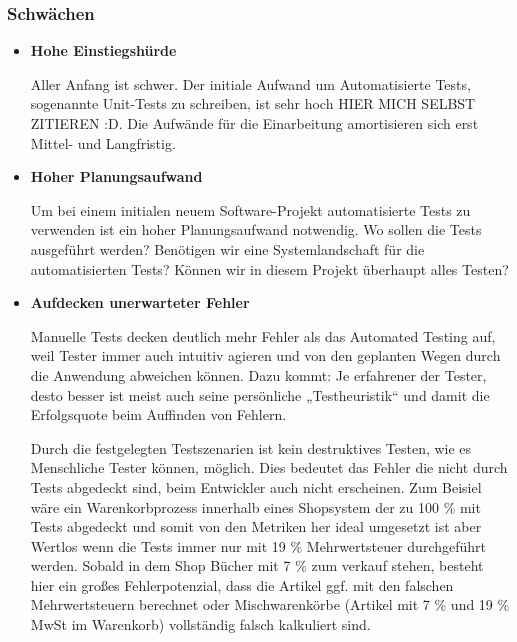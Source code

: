 \subsubsection{Schwächen}
\begin{itemize}	
	\item \textbf{Hohe Einstiegshürde}
	
	Aller Anfang ist schwer. Der initiale Aufwand um Automatisierte Tests, sogenannte Unit-Tests zu schreiben, ist sehr hoch HIER MICH SELBST ZITIEREN :D. Die Aufwände für die Einarbeitung amortisieren sich erst Mittel- und Langfristig.
	
	\item \textbf{Hoher Planungsaufwand}
	
	Um bei einem initialen neuem Software-Projekt automatisierte Tests zu verwenden ist ein hoher Planungsaufwand notwendig. Wo sollen die Tests ausgeführt werden? Benötigen wir eine Systemlandschaft für die automatisierten Tests? Können wir in diesem Projekt überhaupt alles Testen?
	
	\item \textbf{Aufdecken unerwarteter Fehler}
	
	Manuelle Tests decken deutlich mehr Fehler als das Automated Testing auf, weil Tester immer auch intuitiv agieren und von den geplanten Wegen durch die Anwendung abweichen können. Dazu kommt: Je erfahrener der Tester, desto besser ist meist auch seine persönliche „Testheuristik“ und damit die Erfolgsquote beim Auffinden von Fehlern.
	
	Durch die festgelegten Testszenarien ist kein destruktives Testen, wie es Menschliche Tester können, möglich. Dies bedeutet das Fehler die nicht durch Tests abgedeckt sind, beim Entwickler auch nicht erscheinen. Zum Beisiel wäre ein Warenkorbprozess innerhalb eines Shopsystem der zu 100 \% mit Tests abgedeckt und somit von den Metriken her ideal umgesetzt ist aber Wertlos wenn die Tests immer nur mit 19 \% Mehrwertsteuer durchgeführt werden. Sobald in dem Shop Bücher mit 7 \% zum verkauf stehen, besteht hier ein großes Fehlerpotenzial, dass die Artikel ggf. mit den falschen Mehrwertsteuern berechnet oder Mischwarenkörbe (Artikel mit 7 \% und 19 \% MwSt im Warenkorb) vollständig falsch kalkuliert sind. 
	
\end{itemize}
